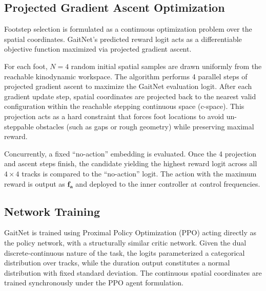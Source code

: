 \subsection{Projected Gradient Ascent Optimization}
\label{subsec:methodology-gaitnet-gradient-ascent}

Footstep selection is formulated as a continuous optimization problem over the spatial coordinates. GaitNet’s predicted reward logit acts as a differentiable objective function maximized via projected gradient ascent.

For each foot, $N=4$ random initial spatial samples are drawn uniformly from the reachable kinodynamic workspace. The algorithm performs 4 parallel steps of projected gradient ascent to maximize the GaitNet evaluation logit. After each gradient update step, spatial coordinates are projected back to the nearest valid configuration within the reachable stepping continuous space (c-space). This projection acts as a hard constraint that forces foot locations to avoid un-steppable obstacles (such as gaps or rough geometry) while preserving maximal reward.

Concurrently, a fixed ``no-action'' embedding is evaluated. Once the 4 projection and ascent steps finish, the candidate yielding the highest reward logit across all $4 \times 4$ tracks is compared to the ``no-action'' logit. The action with the maximum reward is output as $\mathbf{f_a}$ and deployed to the inner controller at control frequencies.

\subsection{Network Training}
\label{subsec:methodology-gaitnet-training}

GaitNet is trained using Proximal Policy Optimization (PPO) \cite{Schulman_proximal_2017} acting directly as the policy network, with a structurally similar critic network. Given the dual discrete-continuous nature of the task, the logits parameterized a categorical distribution over tracks, while the duration output constitutes a normal distribution with fixed standard deviation. The continuous spatial coordinates are trained synchronously under the PPO agent formulation.
